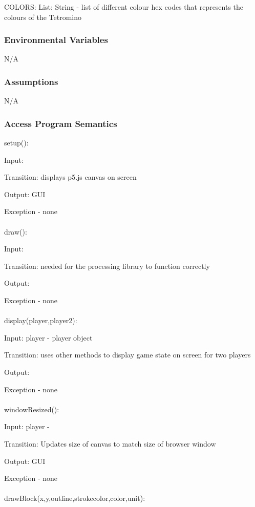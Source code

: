 \documentclass[12,english]{article}
\begin{document}
		COLORS: List: String - list of different colour hex codes that represents the colours of the Tetromino\\
		
		
		\subsubsection{Environmental Variables}
		
		N/A 
		
		\subsubsection{Assumptions}
		
		N/A

		\subsubsection{Access Program Semantics}
		
	  setup():
		
	  Input: 
		
	  Transition: displays p5.js canvas on screen
	  
	  Output: GUI
	  
	  Exception - none\\ 
\\
	  draw():
		
	  Input: 
		
	  Transition: needed for the processing library to function correctly
	  
	  Output: 
	  
	  Exception - none\\ 
	  \\
	  display(player,player2):
		
	  Input: player - player object
		
	  Transition: uses other methods to display game state on screen for two players
	  
	  Output: 
	  
	  Exception - none\\ 
	  \\
	  windowResized():
		
	  Input: player -
		
	  Transition: Updates size of canvas to match size of browser window
	  
	  Output: GUI
	  
	  Exception - none\\ 	  	  
	  \\
	  drawBlock(x,y,outline,strokecolor,color,unit):
		
\end{document}
